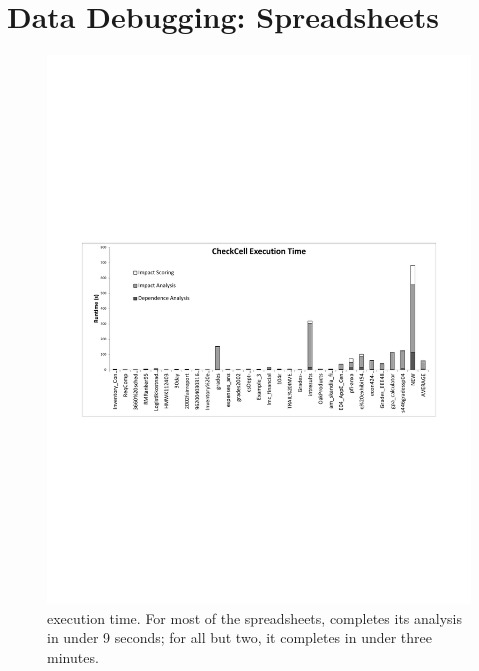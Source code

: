 \section{Data Debugging: Spreadsheets}
\label{sec:evaluation}

\begin{figure}[!t]
\centering
\includegraphics[width=5.5in]{execution_time_graph}
  \caption{\checkcell{} execution time. For most of the spreadsheets, \checkcell{} completes its analysis in under 9 seconds; for all but two, it completes in under three minutes.\label{fig:execution_time_graph}}
\end{figure}
 
